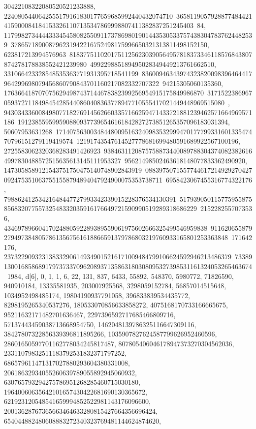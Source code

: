 {{{30422108322080520521233888, 2240805440642555179161830177659685992440432074710\
36581190579288774844214159000841841533261107135347869998807411382837251245403\
84, 1179982734444333454580825509117378698019014435305337574383047837624482539\
378657189008796231942216752498175996650321313811498152150, 623817213994576963\
81837751102017511256230390564957818373346118576843807874278178838552421239980\
499229885189495028349449213761662510, 331066423328548535363771931395718541199\
83600946343974323820098396464417964299698079456860790843701160217082332707322\
94215305060135360, 1763664187070756294987437144678382399256954915175849986870\
31715223869670593727118498454285440860408363778947710555417021449448969515080\
, 943034336008498077182769145626603357166259471433721881239462571664969571186\
1912385595995908809377396546161842827273851265357096183031394, 50607953631268\
17140756300348448009516324098353299947017779933160133547470796151279119419574\
12191743547614527778681699480591689922567100196, 2725583062320368283491426923\
93846311208757588734400897883043740823826164997830488572515635613145111953327\
95621498502463618148077833362490920, 1473058589121543751750475140748902843919\
08839750715577446172149292704270924753510637551558794894047924900075353738711\
6958423067455316774322176, 79886241253421648447727993342339015228376534130391\
51793905011577595587585683207755732548332035916176649721590990519289318686229\
2152282557073536, 43469789660417024880592289389559061975602666325499546959838\
91162065587927949738480578613567561618866591379786803219760933165801253363848\
171642176, 237322909323138332906149349015216171009484799106624592946213486379\
73389130016858689179737337096208937135863180308095327398531161324053265463674\
1984}}, {d[6], {0, 1, 1, 6, 22, 131, 837, 6433, 55892, 548370, 5980772, 
   71826590, 940910184, 13335581935, 203007925568, 3298059152784, 
   56857014515648, 1034952498485174, 19804190937791058, 396833839534435772, 
   8298195265340537276, 180533070856633858272, 4075168170733166665675, 
   95211632171482701636467, 2297396592717685466809716, 
   57137443459038713668954750, 1462048139786325116647309116, 
   38427807322856339396811895266, 1035907827624587799626952460596, 
   28601650597701162778034245817487, 807805406046178947373270304562036, 
   23311079832511183792531832371797252, 686579611471317027880293604380331008, 
   20618632934055260639789055892945060932, 
   630765793294275786951268285460715030180, 
   19640060635642101657430422681690130365672, 
   621923120548541659994852522981143176096600, 
   20013628767365663464633280815427664356696424, 
   654044882480608883272340323769481144624874620, 
}}}
